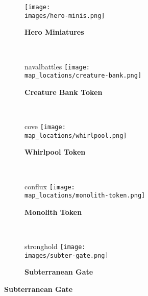 \begin{figure}[H]
  \begin{subfigure}[c]{0.4\linewidth}
    \centering
    \texttt{[image: \\images/hero-minis.png]}
    \caption{\textbf{Hero Miniatures}}
  \end{subfigure}
  ~
  \begin{subfigure}[c]{0.12\linewidth}
    \begin{expansionmini}{navalbattles}
      \vspace{3mm}
      \centering
      \texttt{[image: \\map\_locations/creature-bank.png]}
      \caption{\textbf{Creature Bank Token}}
    \end{expansionmini}
  \end{subfigure}
  ~
  \begin{subfigure}[c]{0.12\linewidth}
    \begin{expansionmini}{cove}
      \vspace{3mm}
      \centering
      \texttt{[image: \\map\_locations/whirlpool.png]}
      \caption{\textbf{Whirlpool Token \phantom{Population}}}
    \end{expansionmini}
  \end{subfigure}
  ~
  \begin{subfigure}[c]{0.12\linewidth}
    \begin{expansionmini}{conflux}
      \vspace{3mm}
      \centering
      \texttt{[image: \\map\_locations/monolith-token.png]}
      \caption{\textbf{Monolith Token \phantom{Population}}}
    \end{expansionmini}
  \end{subfigure}
  ~
  \begin{subfigure}[c]{0.12\linewidth}
    \begin{expansionmini}{stronghold}
      \centering
      \texttt{[image: \\images/subter-gate.png]}
      \vspace*{-1em}
      \caption{\textbf{Subterranean Gate}}
    \end{expansionmini}
  \end{subfigure}
\end{figure}
\vspace*{-1.7em}
